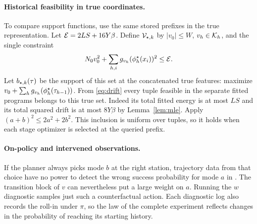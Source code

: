 \paragraph{Historical feasibility in true coordinates.}
To compare support functions, use the same stored prefixes in the true representation. Let $\mathcal E=2LS+16Y\beta$. Define $\mathcal V_{\star,k}$ by $|v_0|\le W$, $v_h\in\mathcal K_h$, and the single constraint
\[
 N_0v_0^2+\sum_{h,i}g_{v_h}(\phi_h^\star(x_i))^2\le\mathcal E .
\]
Let $b_{\star,k}(\tau)$ be the support of this set at the concatenated true features: maximize $v_0+\sum_h g_{v_h}(\phi_h^\star(\tau_{h-1}))$. From \eqref{eq:drift} every tuple feasible in the separate fitted programs belongs to this true set. Indeed its total fitted energy is at most $LS$ and its total squared drift is at most $8Y\beta$ by Lemma~\ref{lem:mle}. Apply $(a+b)^2\le2a^2+2b^2$. This inclusion is uniform over tuples, so it holds when each stage optimizer is selected at the queried prefix.

\paragraph{On-policy and intervened observations.}
If the planner always picks mode $b$ at the right station, trajectory data from that choice have no power to detect the wrong success probability for mode $a$ in . The transition block of $v$ can nevertheless put a large weight on $a$. Running the $w$ diagnostic samples just such a counterfactual action. Each diagnostic log also records the roll-in under $\pi$, so the law of the complete experiment reflects changes in the probability of reaching its starting history.


